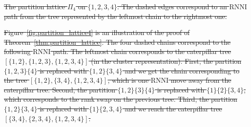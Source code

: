 \documentclass[11pt]{amsart}
\newcommand{\rnni}{\mathrm{RNNI}}
\providecommand{\DIFdeltex}[1]{{\protect\color{red}\sout{#1}}}                      %
\providecommand{\DIFdelend}{} %
\providecommand{\DIFdelFL}[1]{\DIFdel{#1}} %
\providecommand{\DIFdel}[1]{\texorpdfstring{\DIFdeltex{#1}}{}} %
\DeclareRobustCommand{\DIFdelend}{\DIFOaddend \let\includegraphics\DIFOincludegraphics} %
\begin{document}
{%
\DIFdelFL{The partition lattice $\Pi_4$ on $\{1,2,3,4\}$.
The dashed edges correspond to an $\rnni$ path from the tree represented by the leftmost chain to the rightmost one.}}

\DIFdel{Figure~\ref{fig:partition_lattice4} is an illustration of the proof of Theorem~\ref{thm:partition_lattice}.
The four dashed chains correspond to the following $\rnni$ path.
The leftmost chain corresponds to the caterpillar tree $[\{1, 2\}, \{1, 2, 3\}, \{1, 2, 3, 4\}]$ (in the cluster representation).
First, the partition $\{1, 2, 3\} \{4\}$ is replaced with $\{1, 2\} \{3, 4\}$ and we get the chain corresponding to the tree $[\{1, 2\}, \{3, 4\}, \{1, 2, 3, 4\}]$, which is one $\rnni$ move away from the caterpillar tree.
Second, the partition $\{1, 2\} \{3\} \{4\}$ is replaced with $\{1\} \{2\} \{3, 4\}$, which corresponds to the rank swap on the previous tree.
Third, the partition $\{1, 2\} \{3, 4\}$ is replaced with $\{1\} \{2, 3, 4\}$ and we reach the caterpillar tree $[\{3,4\}, \{2, 3, 4\}, \{1, 2, 3, 4\}]$.
 }\DIFdelend
\end{document}
